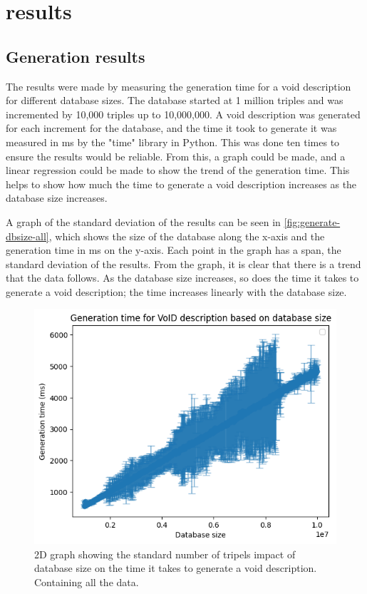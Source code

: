\section{results}\label{sec:results}
\subsection{Generation results}\label{subsec:generation-results}
The results were made by measuring the generation time for a \gls{void} description for different database sizes. The database started at 1 million triples and was incremented by 10,000 triples up to 10,000,000. A \gls{void} description was generated for each increment for the database, and the time it took to generate it was measured in ms by the "time" library in Python. This was done ten times to ensure the results would be reliable. From this, a graph could be made, and a linear regression could be made to show the trend of the generation time. This helps to show how much the time to generate a \gls{void} description increases as the database size increases.

A graph of the standard deviation of the results can be seen in \autoref{fig:generate-dbsize-all}, which shows the size of the database along the x-axis and the generation time in ms on the y-axis. Each point in the graph has a span, the standard deviation of the results. From the graph, it is clear that there is a trend that the data follows. As the database size increases, so does the time it takes to generate a \gls{void} description; the time increases linearly with the database size.

\begin{figure}[htb!]
    \centering
    \includegraphics[width=0.8\columnwidth]{figures/generation-results-graph.png}
    \caption{2D graph showing the standard number of tripels impact of database size on the time it takes to generate a \gls{void} description. Containing all the data.}
    \label{fig:generate-dbsize-all}
\end{figure}

